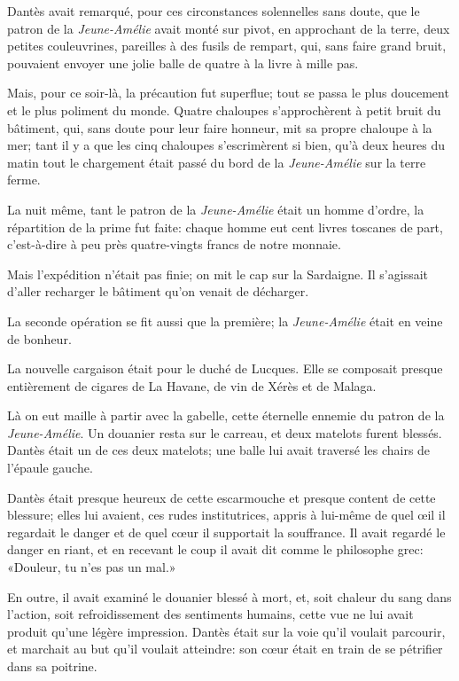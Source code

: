 Dantès avait remarqué, pour ces circonstances solennelles sans doute, que le patron de la \textit{Jeune-Amélie} avait monté sur pivot, en approchant de la terre, deux petites couleuvrines, pareilles à des fusils de rempart, qui, sans faire grand bruit, pouvaient envoyer une jolie balle de quatre à la livre à mille pas.

Mais, pour ce soir-là, la précaution fut superflue; tout se passa le plus doucement et le plus poliment du monde. Quatre chaloupes s'approchèrent à petit bruit du bâtiment, qui, sans doute pour leur faire honneur, mit sa propre chaloupe à la mer; tant il y a que les cinq chaloupes s'escrimèrent si bien, qu'à deux heures du matin tout le chargement était passé du bord de la \textit{Jeune-Amélie} sur la terre ferme.

La nuit même, tant le patron de la \textit{Jeune-Amélie} était un homme d'ordre, la répartition de la prime fut faite: chaque homme eut cent livres toscanes de part, c'est-à-dire à peu près quatre-vingts francs de notre monnaie.

Mais l'expédition n'était pas finie; on mit le cap sur la Sardaigne. Il s'agissait d'aller recharger le bâtiment qu'on venait de décharger.

La seconde opération se fit aussi que la première; la \textit{Jeune-Amélie} était en veine de bonheur.

La nouvelle cargaison était pour le duché de Lucques. Elle se composait presque entièrement de cigares de La Havane, de vin de Xérès et de Malaga.

Là on eut maille à partir avec la gabelle, cette éternelle ennemie du patron de la \textit{Jeune-Amélie}. Un douanier resta sur le carreau, et deux matelots furent blessés. Dantès était un de ces deux matelots; une balle lui avait traversé les chairs de l'épaule gauche.

Dantès était presque heureux de cette escarmouche et presque content de cette blessure; elles lui avaient, ces rudes institutrices, appris à lui-même de quel œil il regardait le danger et de quel cœur il supportait la souffrance. Il avait regardé le danger en riant, et en recevant le coup il avait dit comme le philosophe grec: «Douleur, tu n'es pas un mal.»

En outre, il avait examiné le douanier blessé à mort, et, soit chaleur du sang dans l'action, soit refroidissement des sentiments humains, cette vue ne lui avait produit qu'une légère impression. Dantès était sur la voie qu'il voulait parcourir, et marchait au but qu'il voulait atteindre: son cœur était en train de se pétrifier dans sa poitrine.

